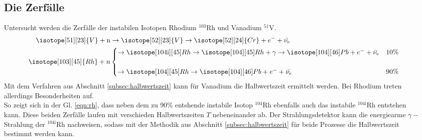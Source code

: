 \subsection{Die Zerfälle}
Untersucht werden die Zerfälle der instabilen Isotopen Rhodium $^{103}$Rh und Vanadium $^{51}$V.
\begin{align}
    \isotope[51][23]{V} + \text{n} &\to \isotope[52][23]{V} \to \isotope[52][24]{Cr} + e^- + \bar{\nu_{\text{e}}}\\
    \isotope[103][45]{Rh}+n&
    \begin{cases}
        \to \isotope[104\text{i}][45]Rh \to \isotope[104][45]Rh+\gamma \to \isotope[104][46]Pb+e^- + \bar{\nu_{\text{e}}} & 10\%\\\\
        \to \isotope[104][45]Rh \to \isotope[104][46]Pb+e^- + \bar{\nu_{\text{e}}} & 90\%
    \end{cases}
    \label{eqn:rh}
\end{align}
Mit dem Verfahren aus Abschnitt \ref{subsec:halbwertszeit} kann für Vanadium die Halbwertszeit ermittelt werden.
Bei Rhodium treten allerdings Besonderheiten auf.\\
So zeigt sich in der Gl. \ref{eqn:rh}, dass neben dem zu 90\% entshende instabile Isotop $^{104}$Rh ebenfalls
auch das instabile $^{104\text{i}}$Rh entstehen kann. Diese beiden Zerfälle laufen mit verschieden Halbwertszeiten $T$ 
nebeneinander ab. Der Strahlungsdetektor kann die energiearme $\gamma-$Strahlung der $^{104\text{i}}$Rh nachweisen,
sodass mit der Methodik aus Abschnitt \ref{subsec:halbwertszeit} für beide Prozesse 
die Halbwertszeit bestimmt werden kann.
